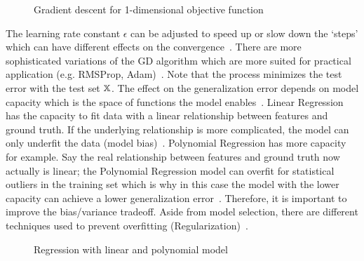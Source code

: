\begin{figure}
    \centering
    
    \caption{Gradient descent for 1-dimensional objective
        function~\citep{goodfellow_deep_2016}\label{fig:grad-desc}}
\end{figure}
The learning rate constant $\epsilon$ can be adjusted to speed up or slow down the `steps' which
can have different effects on the convergence~\citep{goodfellow_deep_2016}.
There are more sophisticated variations of the \ac{GD} algorithm which are more suited for practical
application (e.g. RMSProp, Adam)~\citep{geron_hands-machine_2017}.
Note that the process minimizes the test error with the test set $\mathbb{X}$.
The effect on the generalization error depends on model capacity which is the space of functions
the model enables~\citep{goodfellow_deep_2016}.
Linear Regression has the capacity to fit data with a linear relationship between features and
ground truth.
If the underlying relationship is more complicated, the model can only underfit the data (model
bias)~\citep{goodfellow_deep_2016}.
Polynomial Regression has more capacity for example.
Say the real relationship between features and ground truth now actually is linear;
the Polynomial Regression model can overfit for statistical outliers in the training set which is why
in this case the model with the lower capacity can achieve a lower generalization
error~\citep{geron_hands-machine_2017}.
Therefore, it is important to improve the bias/variance tradeoff.
Aside from model selection, there are different techniques used to prevent overfitting
(Regularization)~\citep{goodfellow_deep_2016}.
\begin{figure}[h]
    \centering
    \caption{Regression with linear and polynomial model\label{fig:examples}}
\end{figure}

